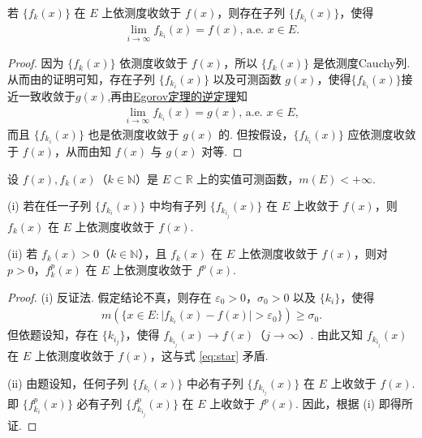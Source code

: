 \documentclass[../../main.tex]{subfiles}%
\begin{document}
\begin{theorem}[Riesz(里斯)定理]\label{theorem:Riesz定理}
若 $\{f_k(x)\}$ 在 $E$ 上依测度收敛于 $f(x)$，则存在子列 $\{f_{k_i}(x)\}$，使得
\begin{align*}
\lim_{i\to\infty}f_{k_i}(x)=f(x),\, \text{a.e. }x\in E.
\end{align*}
\end{theorem}
\begin{proof}

因为 $\{f_k(x)\}$ 依测度收敛于 $f(x)$，所以 $\{f_k(x)\}$ 是依测度Cauchy列. 从而由的证明可知，存在子列 $\{f_{k_i}(x)\}$ 以及可测函数 $g(x)$，使得$\{f_{k_i}(x)\}$接近一致收敛于$g(x)$,再由\hyperref[theorem:Egorov定理的逆定理]{Egorov定理的逆定理}知
\begin{align*}
\lim_{i\to\infty}f_{k_i}(x)=g(x),\,\text{a.e. }x\in E,
\end{align*}
而且 $\{f_{k_i}(x)\}$ 也是依测度收敛于 $g(x)$ 的. 但按假设，$\{f_{k_i}(x)\}$ 应依测度收敛于 $f(x)$，从而由知 $f(x)$ 与 $g(x)$ 对等. 

\end{proof}

\begin{example}
设 $f(x),f_k(x)$（$k\in\mathbb{N}$）是 $E\subset\mathbb{R}$ 上的实值可测函数，$m(E)<+\infty$.

(i) 若在任一子列 $\{f_{k_i}(x)\}$ 中均有子列 $\{f_{k_{i_j}}(x)\}$ 在 $E$ 上收敛于 $f(x)$，则 $f_k(x)$ 在 $E$ 上依测度收敛于 $f(x)$.

(ii) 若 $f_k(x)>0$（$k\in\mathbb{N}$），且 $f_k(x)$ 在 $E$ 上依测度收敛于 $f(x)$，则对 $p>0$，$f_k^p(x)$ 在 $E$ 上依测度收敛于 $f^p(x)$.
\end{example}
\begin{proof}

(i) 反证法. 假定结论不真，则存在 $\varepsilon_0>0$，$\sigma_0>0$ 以及 $\{k_i\}$，使得
\begin{align}
m(\{x\in E:\vert f_{k_i}(x)-f(x)\vert>\varepsilon_0\})\geqslant\sigma_0.\label{eq:star}
\end{align}
但依题设知，存在 $\{k_{i_j}\}$，使得 $f_{k_{i_j}}(x)\to f(x)$（$j\to\infty$）. 由此又知 $f_{k_{i_j}}(x)$ 在 $E$ 上依测度收敛于 $f(x)$，这与式 \eqref{eq:star} 矛盾.

(ii) 由题设知，任何子列 $\{f_{k_i}(x)\}$ 中必有子列 $\{f_{k_{i_j}}(x)\}$ 在 $E$ 上收敛于 $f(x)$. 即 $\{f_{k_i}^p(x)\}$ 必有子列 $\{f_{k_{i_j}}^p(x)\}$ 在 $E$ 上收敛于 $f^p(x)$. 因此，根据 (i) 即得所证. 

\end{proof}
\end{document}
